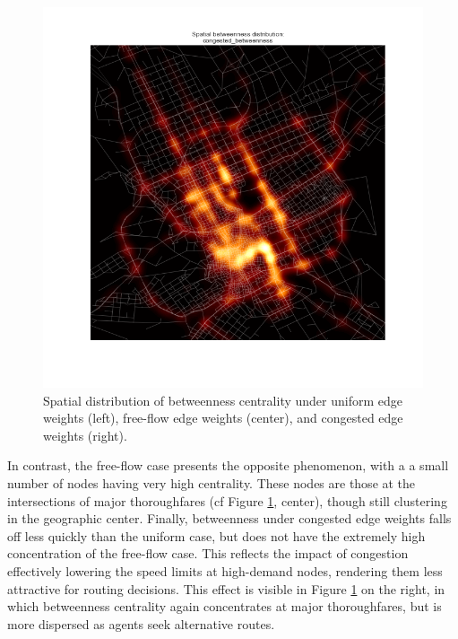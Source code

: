\documentclass[english]{scrartcl}
\begin{document}
			\begin{figure}
				\begin{center}
					\includegraphics[scale = 0.2]{betweenness_spatial.png}
				\end{center}
				\caption{Spatial distribution of betweenness centrality under uniform edge weights (left), free-flow edge weights (center), and congested edge weights (right).}
				\label{fig:3}
			\end{figure}
			 In contrast, the free-flow case presents the opposite phenomenon, with a a small number of nodes having very high centrality. These nodes are those at the intersections of major thoroughfares (cf Figure \ref{fig:3}, center), though still clustering in the geographic center. Finally, betweenness under congested edge weights falls off less quickly than the uniform case, but does not have the extremely high concentration of the free-flow case. This reflects the impact of congestion effectively lowering the speed limits at high-demand nodes, rendering them less attractive for routing decisions. This effect is visible in Figure \ref{fig:3} on the right, in which betweenness centrality again concentrates at major thoroughfares, but is more dispersed as agents seek alternative routes. 
			
\end{document}
